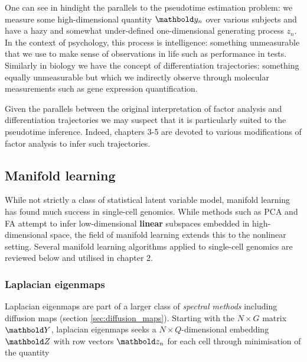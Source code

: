 One can see in hindight the parallels to the pseudotime estimation problem: we measure some high-dimensional quantity $\mby_n$ over various subjects and have a hazy and somewhat under-defined one-dimensional generating process $z_n$. In the context of psychology, this process is intelligence: something unmeasurable that we use to make sense of observations in life such as performance in tests. Similarly in biology we have the concept of differentiation trajectories: something equally unmeasurable but which we indirectly observe through molecular measurements such as gene expression quantification.

Given the parallels between the original interpretation of factor analysis and differentiation trajectories we may suspect that it is particularly suited to the pseudotime inference. Indeed, chapters 3-5 are devoted to various modifications of factor analysis to infer such trajectories.




\subsection{Manifold learning}

While not strictly a class of statistical latent variable model, manifold learning has found much success in single-cell genomics. While methods such as PCA and FA attempt to infer low-dimensional \textbf{linear} subspaces embedded in high-dimensional space, the field of manifold learning extends this to the nonlinear setting. Several manifold learning algorithms applied to single-cell genomics are reviewed below and utilised in chapter 2.

\subsubsection{Laplacian eigenmaps}

Laplacian eigenmaps \cite{Belkin2003} are part of a larger class of \emph{spectral methods} including diffusion maps (section \ref{sec:diffusion_maps}). Starting with the $N \times G$ matrix $\mbY$, laplacian eigenmaps seeks a $N \times Q$-dimensional embedding $\mbZ$ with row vectors $\mbz_n$ for each cell through minimisation of the quantity

